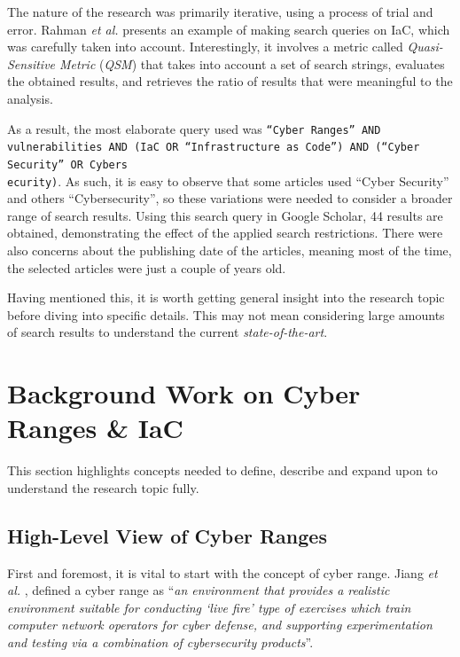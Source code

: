 The nature of the research was primarily iterative, using a process of trial and error. Rahman \textit{et al.} \cite{systematic_mapping_ref} presents an example of making search queries on IaC, which was carefully taken into account. Interestingly, it involves a metric called \textit{Quasi-Sensitive Metric} (\textit{QSM}) that takes into account a set of search strings, evaluates the obtained results, and retrieves the ratio of results that were meaningful to the analysis. 

As a result, the most elaborate query used was \texttt{``Cyber Ranges'' AND vulnerabilities AND (IaC OR ``Infrastructure as Code'') AND (``Cyber Security'' OR Cybers}\\ \texttt{ecurity)}. As such, it is easy to observe that some articles used ``Cyber Security'' and others ``Cybersecurity'', so these variations were needed to consider a broader range of search results. Using this search query in Google Scholar, 44 results are obtained, demonstrating the effect of the applied search restrictions. There were also concerns about the publishing date of the articles, meaning most of the time, the selected articles were just a couple of years old. 

Having mentioned this, it is worth getting general insight into the research topic before diving into specific details. This may not mean considering large amounts of search results to understand the current \textit{state-of-the-art}.

\section{Background Work on Cyber Ranges \& IaC} \label{sec:background}

This section highlights concepts needed to define, describe and expand upon to understand the research topic fully.

\subsection{High-Level View of Cyber Ranges} \label{sec:high_level_cr_explanation}

First and foremost, it is vital to start with the concept of cyber range. Jiang \textit{et al.} \cite{pandora_ref}, defined a cyber range as ``\textit{an environment that provides a realistic environment suitable for conducting `live fire' type of exercises which train computer network operators for cyber defense, and supporting experimentation and testing via a combination of cybersecurity products}''.

